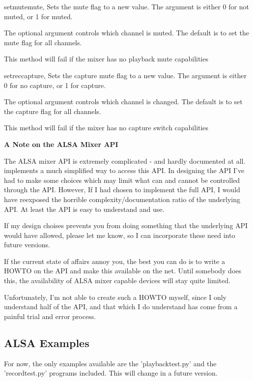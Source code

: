 \begin{methoddesc}[Mixer]{setmute}{mute, }
Sets the mute flag to a new value. The  argument is either 0 for not muted, or 1 for muted.

The optional  argument controls which channel is muted. The default is to set the mute flag
for all channels.

This method will fail if the mixer has no playback mute capabilities
\end{methoddesc}

\begin{methoddesc}[Mixer]{setrec}{capture,}
Sets the capture mute flag to a new value. The  argument is either 0 for no capture, 
or 1 for capture.

The optional  argument controls which channel is changed. The default is to set the capture flag
for all channels.

This method will fail if the mixer has no capture switch capabilities
\end{methoddesc}


\textbf{A Note on the ALSA Mixer API}

The ALSA mixer API is extremely complicated - and hardly documented at all.  implements
a much simplified way to access this API. In designing the API I've had to make some choices which
may limit what can and cannot be controlled through the API. However, If I had chosen to implement the
full API, I would have reexposed the horrible complexity/documentation ratio of the underlying API.
At least the  API is easy to understand and use.

If my design choises prevents you from doing something that the underlying API would have allowed,
please let me know, so I can incorporate these need into future versions.

If the current state of affairs annoy you, the best you can do is to write a HOWTO on the API and
make this available on the net. Until somebody does this, the availability of ALSA mixer capable
devices will stay quite limited.

Unfortunately, I'm not able to create such a HOWTO myself, since I only understand half of the API,
and that which I do understand has come from a painful trial and error process.



\subsection{ALSA Examples \label{pcm-example}}

For now, the only examples available are the 'playbacktest.py' and the 'recordtest.py' programs included.
This will change in a future version.
